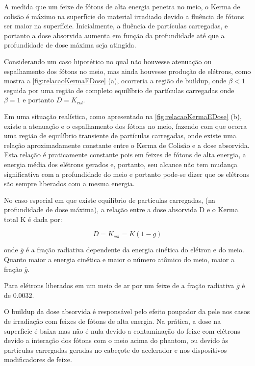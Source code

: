 \documentclass[11pt,a4paper]{article}
\newcounter{exemplo}
\begin{document}
		A medida que um feixe de fótons de alta energia penetra no meio, o Kerma de colisão é máximo na superfície do material irradiado devido a fluência de fótons ser maior na superfície. Inicialmente, a fluência de partículas carregadas, e portanto a dose absorvida aumenta em função da profundidade até que a profundidade de dose máxima seja atingida.

		Considerando um caso hipotético no qual não houvesse atenuação ou espalhamento dos fótons no meio, mas ainda houvesse produção de elétrons, como mostra a   \ref{fig:relacaoKermaEDose} (a), ocorreria a região de buildup, onde $\beta < 1$ seguida por uma região de completo equilíbrio de partículas carregadas onde $\beta = 1$ e portanto $D = K_{col}$.

		Em uma situação realística, como apresentado na   \ref{fig:relacaoKermaEDose} (b), existe a atenuação e o espalhamento dos fótons no meio, fazendo com que ocorra uma região de equilíbrio transiente de partículas carregadas, onde existe uma relação aproximadamente constante entre o Kerma de Colisão e a dose absorvida. Esta relação é praticamente constante pois em feixes de fótons de alta energia, a energia média dos elétrons gerados e, portanto, seu alcance não tem mudança significativa com a profundidade do meio e portanto pode-se dizer que os elétrons são sempre liberados com a mesma energia.

		No caso especial em que existe equilíbrio de partículas carregadas, (na profundidade de dose máxima), a relação entre a dose absorvida D e o Kerma total K é dada por:

			\begin{equation}
				D = K_{col} = K(1 - \bar{g})
			\end{equation}

		\noindent onde $\bar{g}$ é a fração radiativa dependente da energia cinética do elétron e do meio. Quanto maior a energia cinética e maior o número atômico do meio, maior a fração $\bar{g}$.

		\begin{exemplo}[Exemplo]
			Para elétrons liberados em um meio de ar por um feixe de  a fração radiativa $\bar{g}$ é de 0.0032.
		\end{exemplo}

		O buildup da dose absorvida é responsável pelo efeito poupador da pele nos casos de irradiação com feixes de fótons de alta energia. Na prática, a dose na superfície é baixa mas não é nula devido a contaminação do feixe com elétrons devido a interação dos fótons com o meio acima do phantom, ou devido às partículas carregadas geradas no cabeçote do acelerador e nos dispositivos modificadores de feixe.
\end{document}
